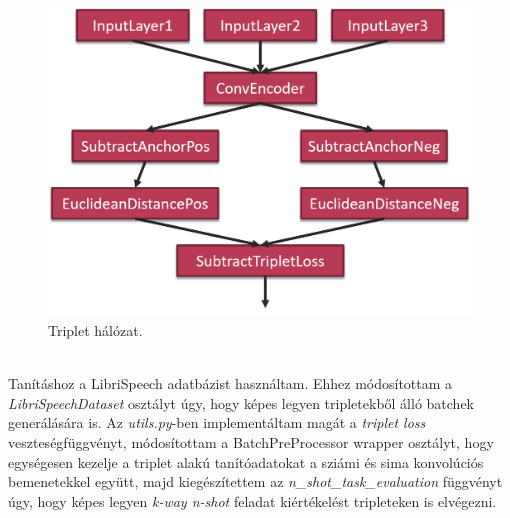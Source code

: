 \begin{figure}[!ht]
	\centering
	\includegraphics[width=120mm, keepaspectratio]{figures/triplet-network.png}
	\caption{Triplet hálózat.}
	\label{fig:triplet-network}
\end{figure}
\ \\
Tanításhoz a LibriSpeech adatbázist használtam. Ehhez módosítottam a \emph{LibriSpeechDataset} osztályt úgy, hogy képes legyen tripletekből álló batchek generálására is.
\newline
\newline
Az \emph{utils.py}-ben implementáltam magát a \emph{triplet loss} veszteségfüggvényt, módosítottam a BatchPreProcessor wrapper osztályt, hogy egységesen kezelje a triplet alakú tanítóadatokat a sziámi és sima konvolúciós bemenetekkel együtt, majd kiegészítettem az \emph{n\_shot\_task\_evaluation} függvényt úgy, hogy képes legyen \emph{k-way n-shot} feladat kiértékelést tripleteken is elvégezni.

